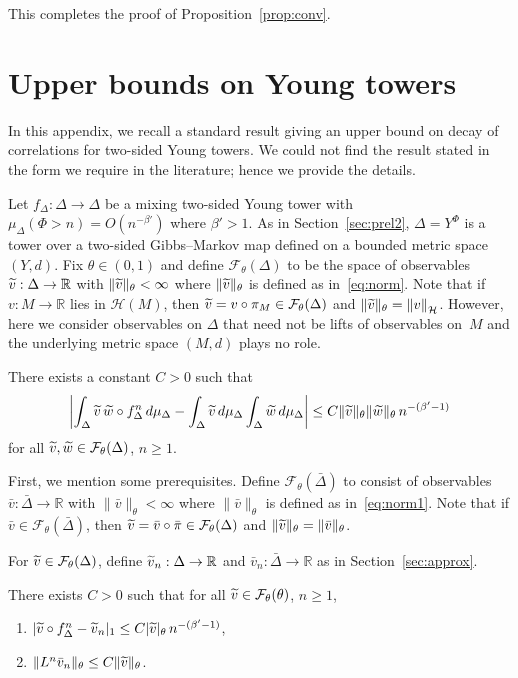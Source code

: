 \documentclass[AHL,Unicode,longabstracts,published]{cedram}
\newcommand{\R}{\mathbb{R}}
\newcommand{\cF}{\mathcal{F}}
\newcommand{\cH}{\mathcal{H}}
\newcommand{\tw}{\widetilde{w}}
\newcommand{\tv}{\tilde{v}}
\newcommand{\bDelta}{\bar{\Delta}}
\newcommand*{\alphenumi}{\renewcommand*{\theenumi}{\alph{enumi}}}
\let\oldtilde\tilde
\renewcommand*{\tilde}[1]{\mathchoice{\widetilde{#1}}{\widetilde{#1}}{\oldtilde{#1}}{\oldtilde{#1}}}
\begin{document}
This completes the proof of Proposition~\ref{prop:conv}.



\section{Upper bounds on Young towers}\label{app:upper}

In this appendix, we recall a standard result giving an upper bound on decay of correlations for two-sided Young towers. We could not find the result stated in the form we require in the literature; hence we provide the details.

Let $f_\Delta:\Delta\to\Delta$ be a mixing two-sided Young tower with $\mu_\Delta(\Phi>n)=O(n^{-\beta'})$ where $\beta'>1$. As in Section~\ref{sec:prel2}, $\Delta=Y^\Phi$ is a tower over a two-sided Gibbs--Markov map defined on a bounded metric space $(Y,d)$. Fix $\theta\in(0,1)$ and define $\cF_\theta(\Delta)$ to be the space of observables $\tv:\Delta\to\R$ with $\|\tv\|_\theta<\infty$ where $\|\tv\|_\theta$ is defined as in~\eqref{eq:norm}. Note that if $v:M\to\R$ lies in $\cH(M)$, then $\tv=v\circ\pi_M\in\cF_\theta(\Delta)$ and $\|\tv\|_\theta={\|v\|}_\cH$. However, here we consider observables on $\Delta$ that need not be lifts of observables on~$M$ and the underlying metric space $(M,d)$ plays no role.

\begin{theo} \label{thm:upper}
There exists a constant $C>0$ such that
\[
\left| \int_\Delta \tv\,\tw\circ f_\Delta^n\,d\mu_\Delta -\int_\Delta \tv\,d\mu_\Delta
\int_\Delta \tw\,d\mu_\Delta\right|
\le C\|\tv\|_\theta \|\tw\|_\theta \, n^{-(\beta'-1)}
\]
for all $\tv,\tw\in\cF_\theta(\Delta)$, $n\ge1$.
\end{theo}

First, we mention some prerequisites. Define $\cF_\theta(\bDelta)$ to consist of observables $\bar v:\bDelta\to\R$ with $\|\bar v\|_\theta<\infty$ where $\|\bar v\|_\theta$ is defined as in~\eqref{eq:norm1}. Note that if $\bar v\in \cF_\theta(\bDelta)$, then $\tv=\bar v\circ\bar\pi\in\cF_\theta(\Delta)$ and $\|\tv\|_\theta =\|\bar v\|_\theta$.

For $\tv\in\cF_\theta(\Delta)$, define $\tv_n:\Delta\to\R$ and $\bar v_n:\bDelta\to\R$ as in Section~\ref{sec:approx}.

\goodbreak
\begin{prop}\label{prop:prel}
There exists $C>0$ such that for all $\tv\in\cF_\theta(\theta)$, $n\ge1$,
\begin{enumerate}\alphenumi
\item \label{propB.2.1}$|\tv\circ f_\Delta^n-\tv_n|_1\le C|\tv|_\theta\,n^{-(\beta'-1)}$,
\item \label{propB.2.2}$\|L^n\bar v_n\|_\theta \le C\|\tv\|_\theta$.
\end{enumerate}


\end{prop}
\end{document}
